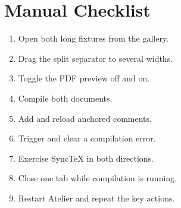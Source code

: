 \documentclass[12pt]{report}
\begin{document}
\chapter{Manual Checklist}
\begin{enumerate}
  \item Open both long fixtures from the gallery.
  \item Drag the split separator to several widths.
  \item Toggle the PDF preview off and on.
  \item Compile both documents.
  \item Add and reload anchored comments.
  \item Trigger and clear a compilation error.
  \item Exercise SyncTeX in both directions.
  \item Close one tab while compilation is running.
  \item Restart Atelier and repeat the key actions.
\end{enumerate}
\end{document}
